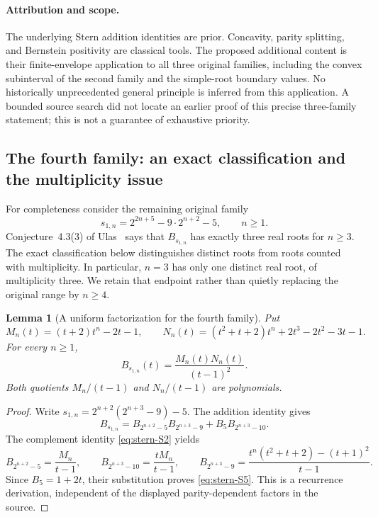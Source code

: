 \documentclass[11pt,a4paper]{article}
\newtheorem{lemma}[theorem]{Lemma}
\theoremstyle{definition}\newtheorem{definition}[theorem]{Definition}
\theoremstyle{remark}\newtheorem{remark}[theorem]{Remark}
\begin{document}
\paragraph{Attribution and scope.}
The underlying Stern addition identities are prior. Concavity,
parity splitting, and Bernstein positivity are classical tools.
The proposed additional content is their finite-envelope application to
all three original families, including the convex subinterval of the
second family and the simple-root boundary values. No historically
unprecedented general principle is inferred from this application.
A bounded source search did not locate an earlier proof of this precise
three-family statement; this is not a guarantee of exhaustive priority.

\subsection{The fourth family: an exact classification and the multiplicity issue}
\label{sec:stern-fourth-family}

For completeness consider the remaining original family
\[
 s_{1,n}=2^{2n+5}-9\cdot2^{n+2}-5,\qquad n\geq1.
\]
Conjecture~4.3(3) of Ulas~\cite{Ulas20} says that
$B_{s_{1,n}}$ has exactly three real roots for $n\geq3$.
The exact classification below distinguishes distinct roots from roots
counted with multiplicity. In particular, $n=3$ has only one distinct
real root, of multiplicity three. We retain that endpoint rather than
quietly replacing the original range by $n\geq4$.

\begin{lemma}[A uniform factorization for the fourth family]
\label{lem:stern-fourth-factorization}
Put
\[
 M_n(t)=(t+2)t^n-2t-1,\qquad
 N_n(t)=(t^2+t+2)t^n+2t^3-2t^2-3t-1.
\]
For every $n\geq1$,
\[
 B_{s_{1,n}}(t)=\frac{M_n(t)N_n(t)}{(t-1)^2}.
 \tag{S5}\label{eq:stern-S5}
\]
Both quotients $M_n/(t-1)$ and $N_n/(t-1)$ are polynomials.
\end{lemma}
\begin{proof}
Write $s_{1,n}=2^{n+2}(2^{n+3}-9)-5$. The addition identity gives
\[
 B_{s_{1,n}}=B_{2^{n+2}-5}B_{2^{n+3}-9}
                 +B_5B_{2^{n+3}-10}.
\]
The complement identity \eqref{eq:stern-S2} yields
\[
 B_{2^{n+2}-5}=\frac{M_n}{t-1},\qquad
 B_{2^{n+3}-10}=\frac{tM_n}{t-1},\qquad
 B_{2^{n+3}-9}=\frac{t^n(t^2+t+2)-(t+1)^2}{t-1}.
\]
Since $B_5=1+2t$, their substitution proves \eqref{eq:stern-S5}.
This is a recurrence derivation, independent of the displayed
parity-dependent factors in the source.
\end{proof}
\end{document}
